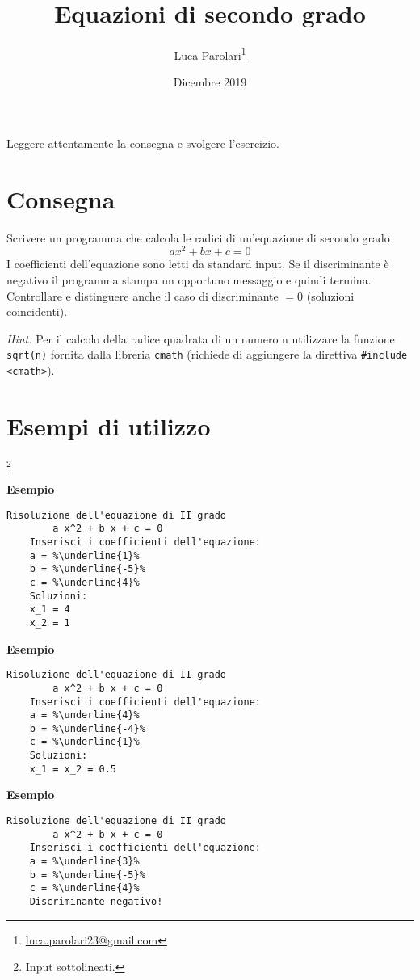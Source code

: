 \documentclass[addpoints,12pt,answers]{exam}
\author{Luca Parolari\footnote{\href{mailto:luca.parolari23@gmail.com}{luca.parolari23@gmail.com}}}
\begin{document}
    
    \title{Equazioni di secondo grado}
    \date{Dicembre 2019}
    
    \maketitle
    
    Leggere attentamente la consegna e svolgere l'esercizio.
    
    \section{Consegna}
    
    Scrivere un programma che calcola le radici di un'equazione di secondo grado
    \[ a x^2 + b x + c = 0 \]
    I coefficienti dell'equazione sono letti da standard input. Se il discriminante è negativo il programma stampa un opportuno messaggio e quindi termina. Controllare e distinguere anche il caso di discriminante $= 0$ (soluzioni coincidenti).
    
    \textit{Hint.} Per il calcolo della radice quadrata di un numero n utilizzare la funzione \texttt{sqrt(n)} fornita dalla libreria 
    \texttt{cmath} (richiede di aggiungere la direttiva \verb|#include <cmath>|).
    
    \section{Esempi di utilizzo} \footnote{Input sottolineati.}

	\noindent\textbf{Esempio}
	\begin{lstlisting}[style=verbatim]
	Risoluzione dell'equazione di II grado
	    a x^2 + b x + c = 0
	Inserisci i coefficienti dell'equazione:
	a = %\underline{1}%
	b = %\underline{-5}%
	c = %\underline{4}%
	Soluzioni:
	x_1 = 4
	x_2 = 1
	\end{lstlisting}

	\noindent\textbf{Esempio}
	\begin{lstlisting}[style=verbatim]
	Risoluzione dell'equazione di II grado
	    a x^2 + b x + c = 0
	Inserisci i coefficienti dell'equazione:
	a = %\underline{4}%
	b = %\underline{-4}%
	c = %\underline{1}%
	Soluzioni:
	x_1 = x_2 = 0.5
	\end{lstlisting}
	
	\noindent\textbf{Esempio}
	\begin{lstlisting}[style=verbatim]
	Risoluzione dell'equazione di II grado
	    a x^2 + b x + c = 0
	Inserisci i coefficienti dell'equazione:
	a = %\underline{3}%
	b = %\underline{-5}%
	c = %\underline{4}%
	Discriminante negativo!
	\end{lstlisting}
\end{document}

